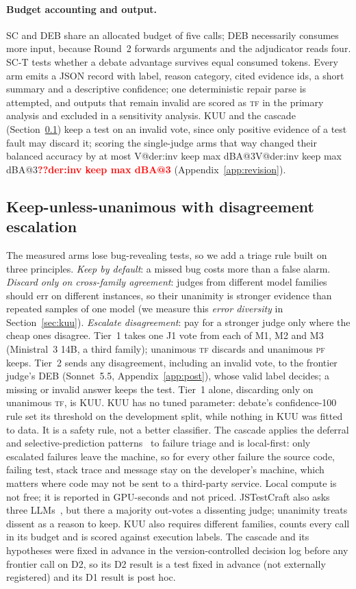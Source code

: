 \documentclass[pdflatex,iicol,sn-mathphys-num]{sn-jnl}
\makeatletter
\newcommand{\V}[1]{\ifcsname V@#1\endcsname\csname V@#1\endcsname\else\textbf{\textcolor{red}{??#1}}\fi}
\newcommand{\PF}{\textsc{pf}}
\newcommand{\TF}{\textsc{tf}}
\makeatother
\begin{document}
\paragraph{Budget accounting and output.} SC and DEB share an allocated budget of five calls; DEB necessarily consumes more input, because Round~2 forwards arguments and the adjudicator reads four. SC-T tests whether a debate advantage survives equal consumed tokens. Every arm emits a JSON record with label, reason category, cited evidence ids, a short summary and a descriptive confidence; one deterministic repair parse is attempted, and outputs that remain invalid are scored as \TF{} in the primary analysis and excluded in a sensitivity analysis. KUU and the cascade (Section~\ref{sec:cascade}) keep a test on an invalid vote, since only positive evidence of a test fault may discard it; scoring the single-judge arms that way changed their balanced accuracy by at most \V{der:inv keep max dBA@3} (Appendix~\ref{app:revision}).

\subsection{Keep-unless-unanimous with disagreement escalation}\label{sec:cascade}
The measured arms lose bug-revealing tests, so we add a triage rule built on three principles. \emph{Keep by default}: a missed bug costs more than a false alarm. \emph{Discard only on cross-family agreement}: judges from different model families should err on different instances, so their unanimity is stronger evidence than repeated samples of one model (we measure this \emph{error diversity} in Section~\ref{sec:kuu}). \emph{Escalate disagreement}: pay for a stronger judge only where the cheap ones disagree. Tier~1 takes one J1 vote from each of M1, M2 and M3 (Ministral~3 14B, a third family); unanimous \TF{} discards and unanimous \PF{} keeps. Tier~2 sends any disagreement, including an invalid vote, to the frontier judge's DEB (Sonnet~5.5, Appendix~\ref{app:post}), whose valid label decides; a missing or invalid answer keeps the test. Tier~1 alone, discarding only on unanimous \TF{}, is KUU. KUU has no tuned parameter: debate's confidence-100 rule set its threshold on the development split, while nothing in KUU was fitted to data. It is a safety rule, not a better classifier. The cascade applies the deferral and selective-prediction patterns~\cite{chen2023frugalgpt,geifman2017selective} to failure triage and is local-first: only escalated failures leave the machine, so for every other failure the source code, failing test, stack trace and message stay on the developer's machine, which matters where code may not be sent to a third-party service. Local compute is not free; it is reported in GPU-seconds and not priced. JSTestCraft also asks three LLMs~\cite{liu2026jstestcraft}, but there a majority out-votes a dissenting judge; unanimity treats dissent as a reason to keep. KUU also requires different families, counts every call in its budget and is scored against execution labels. The cascade and its hypotheses were fixed in advance in the version-controlled decision log before any frontier call on D2, so its D2 result is a test fixed in advance (not externally registered) and its D1 result is post hoc.
\end{document}

